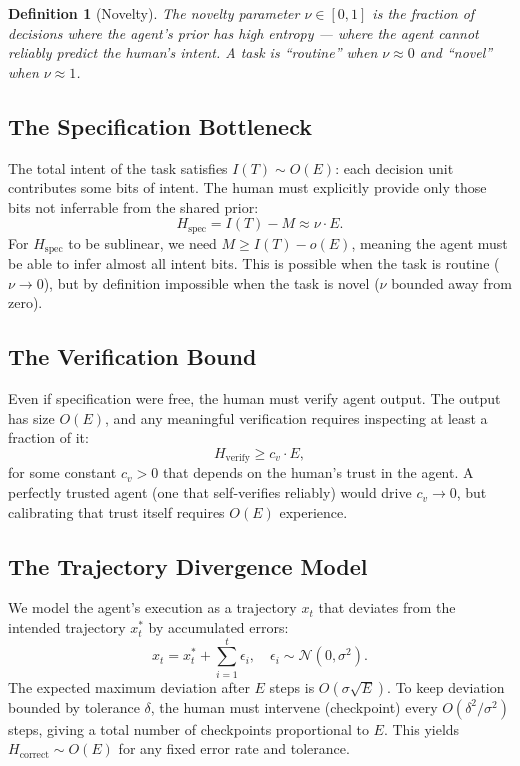 \documentclass[11pt,a4paper]{article}
\newtheorem{definition}{Definition}
\begin{document}
\begin{definition}[Novelty]
The novelty parameter $\nu \in [0,1]$ is the fraction of decisions where the agent's prior has high entropy --- where the agent cannot reliably predict the human's intent. A task is ``routine'' when $\nu \approx 0$ and ``novel'' when $\nu \approx 1$.
\end{definition}

\subsection{The Specification Bottleneck}

The total intent of the task satisfies $I(T) \sim O(E)$: each decision unit contributes some bits of intent. The human must explicitly provide only those bits not inferrable from the shared prior:
\begin{equation}
H_{\text{spec}} = I(T) - M \approx \nu \cdot E.
\end{equation}
For $H_{\text{spec}}$ to be sublinear, we need $M \geq I(T) - o(E)$, meaning the agent must be able to infer almost all intent bits. This is possible when the task is routine ($\nu \to 0$), but by definition impossible when the task is novel ($\nu$ bounded away from zero).

\subsection{The Verification Bound}

Even if specification were free, the human must verify agent output. The output has size $O(E)$, and any meaningful verification requires inspecting at least a fraction of it:
\begin{equation}
H_{\text{verify}} \geq c_v \cdot E,
\end{equation}
for some constant $c_v > 0$ that depends on the human's trust in the agent. A perfectly trusted agent (one that self-verifies reliably) would drive $c_v \to 0$, but calibrating that trust itself requires $O(E)$ experience.

\subsection{The Trajectory Divergence Model}

We model the agent's execution as a trajectory $x_t$ that deviates from the intended trajectory $x^*_t$ by accumulated errors:
\begin{equation}
x_t = x^*_t + \sum_{i=1}^{t} \epsilon_i, \quad \epsilon_i \sim \mathcal{N}(0, \sigma^2).
\end{equation}
The expected maximum deviation after $E$ steps is $O(\sigma\sqrt{E})$. To keep deviation bounded by tolerance $\delta$, the human must intervene (checkpoint) every $O(\delta^2/\sigma^2)$ steps, giving a total number of checkpoints proportional to $E$. This yields $H_{\text{correct}} \sim O(E)$ for any fixed error rate and tolerance.
\end{document}
